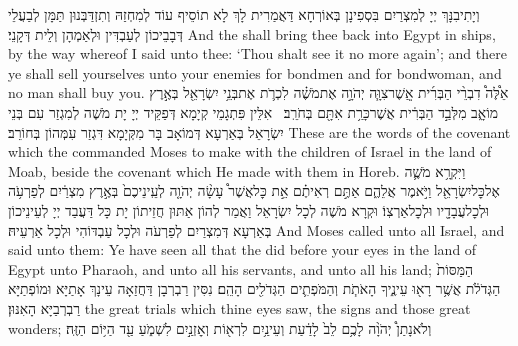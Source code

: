{וְיָתִיבִנָּךְ יְיָ לְמִצְרַיִם בִּסְפִינָן בְּאוֹרְחָא דַּאֲמַרִית לָךְ לָא תוֹסֵיף עוֹד לְמִחְזַהּ וְתִזְדַּבְּנוּן תַּמָּן לְבַעֲלֵי דְּבָבֵיכוֹן לְעַבְדִּין וּלְאַמְהָן וְלֵית דְּקָנֵי׃}
{And the \lord\space shall bring thee back into Egypt in ships, by the way whereof I said unto thee: ‘Thou shalt see it no more again’; and there ye shall sell yourselves unto your enemies for bondmen and for bondwoman, and no man shall buy you.}{}
{אֵ֩לֶּה֩ דִבְרֵ֨י הַבְּרִ֜ית אֲֽשֶׁר\maqqaf צִוָּ֧ה יְהֹוָ֣ה אֶת\maqqaf מֹשֶׁ֗ה לִכְרֹ֛ת אֶת\maqqaf בְּנֵ֥י יִשְׂרָאֵ֖ל בְּאֶ֣רֶץ מוֹאָ֑ב מִלְּבַ֣ד הַבְּרִ֔ית אֲשֶׁר\maqqaf כָּרַ֥ת אִתָּ֖ם בְּחֹרֵֽב׃ \petucha }
{אִלֵּין פִּתְגָמֵי קְיָמָא דְּפַקֵּיד יְיָ יָת מֹשֶׁה לְמִגְזַר עִם בְּנֵי יִשְׂרָאֵל בְּאַרְעָא דְּמוֹאָב בָּר מִקְּיָמָא דִּגְזַר עִמְּהוֹן בְּחוֹרֵב׃}
{These are the words of the covenant which the \lord\space commanded Moses to make with the children of Israel in the land of Moab, beside the covenant which He made with them in Horeb.}{}
\newperek
{}
{וַיִּקְרָ֥א מֹשֶׁ֛ה אֶל\maqqaf כׇּל\maqqaf יִשְׂרָאֵ֖ל וַיֹּ֣אמֶר אֲלֵהֶ֑ם אַתֶּ֣ם רְאִיתֶ֗ם אֵ֣ת כׇּל\maqqaf אֲשֶׁר֩ עָשָׂ֨ה יְהֹוָ֤ה לְעֵֽינֵיכֶם֙ בְּאֶ֣רֶץ מִצְרַ֔יִם לְפַרְעֹ֥ה וּלְכׇל\maqqaf עֲבָדָ֖יו וּלְכׇל\maqqaf אַרְצֽוֹ׃}
{וּקְרָא מֹשֶׁה לְכָל יִשְׂרָאֵל וַאֲמַר לְהוֹן אַתּוּן חֲזֵיתוֹן יָת כָּל דַּעֲבַד יְיָ לְעֵינֵיכוֹן בְּאַרְעָא דְּמִצְרַיִם לְפַרְעֹה וּלְכָל עַבְדּוֹהִי וּלְכָל אַרְעֵיהּ׃}
{And Moses called unto all Israel, and said unto them: Ye have seen all that the \lord\space did before your eyes in the land of Egypt unto Pharaoh, and unto all his servants, and unto all his land;}{}
{הַמַּסּוֹת֙ הַגְּדֹלֹ֔ת אֲשֶׁ֥ר רָא֖וּ עֵינֶ֑יךָ הָאֹתֹ֧ת וְהַמֹּפְתִ֛ים הַגְּדֹלִ֖ים הָהֵֽם׃}
{נִסִּין רַבְרְבָן דַּחֲזַאָה עֵינָךְ אָתַיָּא וּמוֹפְתַיָּא רַבְרְבַיָּא הָאִנּוּן׃}
{the great trials which thine eyes saw, the signs and those great wonders;}{}
{וְלֹא\maqqaf נָתַן֩ יְהֹוָ֨ה לָכֶ֥ם לֵב֙ לָדַ֔עַת וְעֵינַ֥יִם לִרְא֖וֹת וְאׇזְנַ֣יִם לִשְׁמֹ֑עַ עַ֖ד הַיּ֥וֹם הַזֶּֽה׃}
